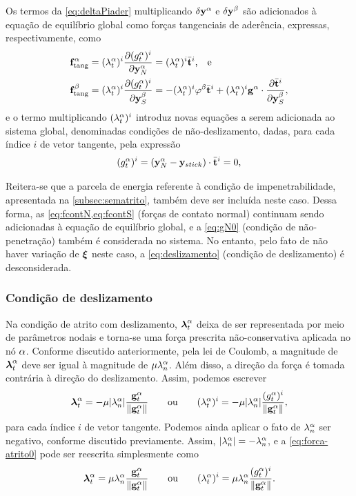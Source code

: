 \documentclass[Tese.tex]{subfiles}
\begin{document}
Os termos da \cref{eq:deltaPiader} multiplicando $\delta\mathbf{y}^\alpha$ e $\delta\mathbf{y}^\beta$ são adicionados à equação de equilíbrio global como forças tangenciais de aderência, expressas, respectivamente, como
\begin{align}
&\mathbf{f}_\text{tang}^\alpha = (\lambda_t^\alpha)^i\dfrac{\partial (g_t^\alpha)^i}{\partial \mathbf{y}_N^\alpha} = (\lambda_t^\alpha)^i \bar{\mathbf{t}}^i  \text{,\quad e} \label{eq:ftangN}\\
&\mathbf{f}_\text{tang}^\beta = (\lambda_t^\alpha)^i\dfrac{\partial (g_t^\alpha)^i}{\partial \mathbf{y}_S^\beta} = - (\lambda_t^\alpha)^i \varphi^\beta\bar{\mathbf{t}}^i + (\lambda_t^\alpha)^i \mathbf{g}^\alpha\cdot\dfrac{\partial\bar{\mathbf{t}}^i}{\partial\mathbf{y}_S^\beta}, \label{eq:ftangS}
\end{align}
e o termo multiplicando $(\lambda_t^\alpha)^i$ introduz novas equações a serem adicionada ao sistema global, denominadas condições de não-deslizamento, dadas, para cada índice $i$ de vetor tangente, pela expressão
\begin{equation}
(g_t^\alpha)^i = \left(\mathbf{y}_N^\alpha-\mathbf{y}_{stick}\right)\cdot\bar{\mathbf{t}}^i = 0, \label{eq:gT0}
\end{equation}

Reitera-se que a parcela de energia referente à condição de impenetrabilidade, apresentada na \autoref{subsec:sematrito}, também deve ser incluída neste caso. Dessa forma, as \cref{eq:fcontN,eq:fcontS} (forças de contato normal) continuam sendo adicionadas à equação de equilíbrio global, e a \cref{eq:gN0} (condição de não-penetração) também é considerada no sistema. No entanto, pelo fato de não haver variação de $\boldsymbol{\xi}$ neste caso, a \cref{eq:deslizamento} (condição de deslizamento) é desconsiderada.


\subsubsection{Condição de deslizamento}

Na condição de atrito com deslizamento, $\boldsymbol{\lambda}_t^\alpha$ deixa de ser representada por meio de parâmetros nodais e torna-se uma força prescrita não-conservativa aplicada no nó $\alpha$. Conforme discutido anteriormente, pela lei de Coulomb, a magnitude de $\boldsymbol{\lambda}_t^\alpha$ deve ser igual à magnitude de $\mu\lambda_n^\alpha$. Além disso, a direção da força é tomada contrária à direção do deslizamento. Assim, podemos escrever
\begin{equation}\label{eq:forca-atrito0}
\boldsymbol{\lambda}_t^\alpha = -\mu|\lambda_n^\alpha|\dfrac{\mathbf{g}_t^\alpha}{\|\mathbf{g}_t^\alpha\|} \qquad\text{ou}\qquad (\lambda_t^\alpha)^i = -\mu|\lambda_n^\alpha|\dfrac{(g_t^\alpha)^i}{\|\mathbf{g}_t^\alpha\|},
\end{equation}
para cada índice $i$ de vetor tangente. Podemos ainda aplicar o fato de $\lambda_n^\alpha$ ser negativo, conforme discutido previamente. Assim, $|\lambda_n^\alpha| = -\lambda_n^\alpha$, e a \cref{eq:forca-atrito0} pode ser reescrita simplesmente como
\begin{equation}\label{eq:forca-atrito}
\boldsymbol{\lambda}_t^\alpha = \mu\lambda_n^\alpha\dfrac{\mathbf{g}_t^\alpha}{\|\mathbf{g}_t^\alpha\|} \qquad\text{ou}\qquad (\lambda_t^\alpha)^i = \mu\lambda_n^\alpha\dfrac{(g_t^\alpha)^i}{\|\mathbf{g}_t^\alpha\|}.
\end{equation}
\end{document}

